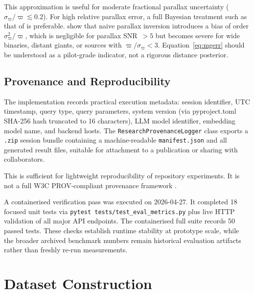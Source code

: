 \documentclass[12pt]{elsarticle}
\newcommand{\parallax}{\varpi}
\begin{document}
This approximation is useful for moderate fractional parallax uncertainty ($\sigma_\parallax / \parallax \lesssim 0.2$). For high relative parallax error, a full Bayesian treatment such as that of \citet{BailerJones2021} is preferable. \citet{BailerJones2021} show that naive parallax inversion introduces a bias of order $\sigma_\parallax^2 / \parallax$, which is negligible for parallax SNR~$>5$ but becomes severe for wide binaries, distant giants, or sources with $\parallax / \sigma_\parallax < 3$. Equation~\eqref{eq:mgerr} should be understood as a pilot-grade indicator, not a rigorous distance posterior.

\subsection{Provenance and Reproducibility}
\label{sec:provenance}

The implementation records practical execution metadata: session identifier, UTC timestamp, query type, query parameters, system version (via pyproject.toml SHA-256 hash truncated to 16 characters), LLM model identifier, embedding model name, and backend hosts. The \texttt{ResearchProvenanceLogger} class exports a \texttt{.zip} session bundle containing a machine-readable \texttt{manifest.json} and all generated result files, suitable for attachment to a publication or sharing with collaborators.

This is sufficient for lightweight reproducibility of repository experiments. It is not a full W3C PROV-compliant provenance framework \citep{Belhajjame2013}.

A containerised verification pass was executed on 2026-04-27. It completed 18 focused unit tests via \texttt{pytest tests/test\_eval\_metrics.py} plus live HTTP validation of all major API endpoints. The containerised full suite records 50 passed tests. These checks establish runtime stability at prototype scale, while the broader archived benchmark numbers remain historical evaluation artifacts rather than freshly re-run measurements.

\section{Dataset Construction}
\label{sec:dataset}
\end{document}
